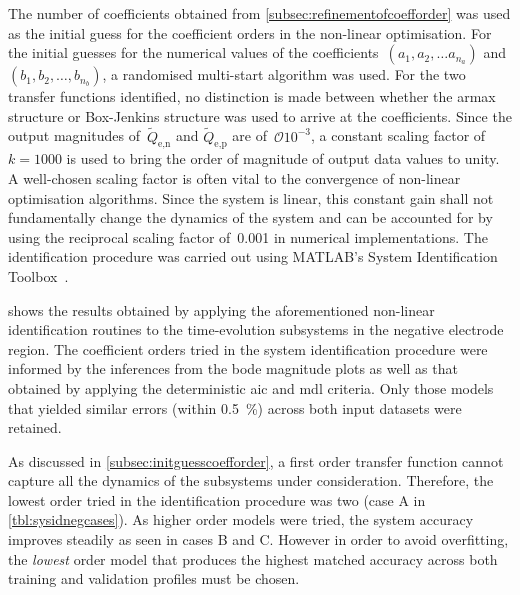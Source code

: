 The  number of  coefficients obtained  from \cref{subsec:refinementofcoefforder}
was  used as  the initial  guess for  the coefficient  orders in  the non-linear
optimisation.  For  the  initial  guesses   for  the  numerical  values  of  the
coefficients~$(a_1, a_2,  \dots a_{n_a})$ and ${(b_1, b_2, \dots  , b_{n_b} )}$, a
randomised  multi-start  algorithm was  used.  For  the two  transfer  functions
identified, no distinction is made  between whether the \gls{armax} structure or
Box-Jenkins structure was  used to arrive at the coefficients.  Since the output
magnitudes of~$\widetilde{Q}_{\text{e,n}}$  and $\widetilde{Q}_{\text{e,p}}$ are
of~$\mathcal{O}{10^{-3}}$,  a  constant  scaling   factor  of~${k  =  1000}$  is
used  to  bring the  order  of  magnitude of  output  data  values to  unity.  A
well-chosen  scaling factor  is often  vital  to the  convergence of  non-linear
optimisation algorithms.  Since the system  is linear, this constant  gain shall
not fundamentally change the dynamics of the  system and can be accounted for by
using the reciprocal  scaling factor of~0.001 in  numerical implementations. The
identification procedure  was carried  out using MATLAB's  System Identification
Toolbox~\cite{matlabsysidtool}.



   shows   the   results  obtained   by   applying   the
aforementioned   non-linear  identification   routines  to   the  time-evolution
subsystems in the negative electrode region. The coefficient orders tried in the
system identification  procedure were informed  by the inferences from  the bode
magnitude plots as well as that obtained by applying the deterministic \gls{aic}
and \gls{mdl}  criteria. Only those  models that yielded similar  errors (within
\SI{0.5}{\percent}) across both input datasets were retained.

As  discussed  in \cref{subsec:initguesscoefforder},   a  first  order  transfer
function cannot capture all the  dynamics of the subsystems under consideration.
Therefore, the lowest order tried in  the identification procedure was two (case
A in \cref{tbl:sysidnegcases}).  As higher order  models were tried,  the system
accuracy improves steadily as  seen in cases B and C. However  in order to avoid
overfitting, the  \emph{lowest} order  model that  produces the  highest matched
accuracy across both training and validation profiles must be chosen.


